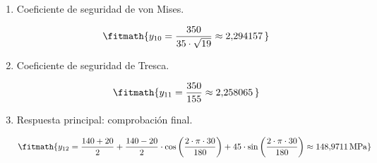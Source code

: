 \begin{enumerate}
\[\fitmath{y_{9}=-\left(\frac{140-20}{2}\right)\cdot \sin\left(\frac{2\cdot \pi\cdot 30}{180}\right)+45\cdot \cos\left(\frac{2\cdot \pi\cdot 30}{180}\right)\approx -29{,}46152\,\mathrm{MPa}}\]

\item Coeficiente de seguridad de von Mises.

\[\fitmath{y_{10}=\frac{350}{35\cdot \sqrt{19}}\approx 2{,}294157\,}\]

\item Coeficiente de seguridad de Tresca.

\[\fitmath{y_{11}=\frac{350}{155}\approx 2{,}258065\,}\]

\item Respuesta principal: comprobación final.

\[\fitmath{y_{12}=\frac{140+20}{2}+\frac{140-20}{2}\cdot \cos\left(\frac{2\cdot \pi\cdot 30}{180}\right)+45\cdot \sin\left(\frac{2\cdot \pi\cdot 30}{180}\right)\approx 148{,}9711\,\mathrm{MPa}}\]

\end{enumerate}
